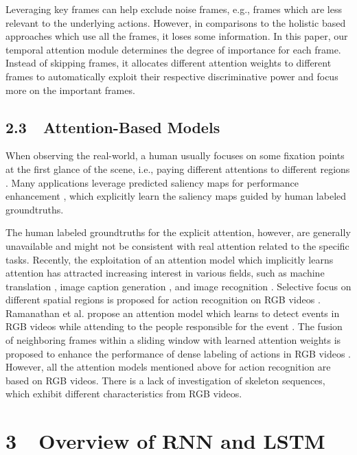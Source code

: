 \documentclass[letterpaper]{article}
\begin{document}
Leveraging key frames can help exclude noise frames, e.g., frames which are less relevant to the underlying actions. However, in comparisons to the holistic based approaches \cite {simonyan2014two,wu2015modeling,zhu2015co} which use all the frames, it loses some information. In this paper, our temporal attention module determines the degree of importance for each frame. Instead of skipping frames, it allocates different attention weights to different frames to automatically exploit their respective discriminative power and focus more on the important frames.


\subsection{2.3~~Attention-Based Models}
When observing the real-world, a human usually focuses on some fixation points at the first glance of the scene, i.e., paying different attentions to different regions \cite{goferman2012context}. Many applications leverage predicted saliency maps for performance enhancement \cite{yu2010object,jiang2014saliency,bazzani2016recurrent}, which explicitly learn the saliency maps guided by human labeled groundtruths.


The human labeled groundtruths for the explicit attention, however, are generally unavailable and might not be consistent with real attention related to the specific tasks.  Recently, the exploitation of an attention model which implicitly learns attention has attracted increasing interest in various fields, such as machine translation \cite{bahdanau2014neural}, image caption generation \cite{xu2015show}, and image recognition \cite{ba2014multiple}. Selective focus on different spatial regions is proposed for action recognition on RGB videos \cite{sharma2015action}. Ramanathan et al. propose an attention model which learns to detect events in RGB videos while attending to the people responsible for the event \cite{Ramanathan2015action}. The fusion of neighboring frames within a sliding window with learned attention weights is proposed to enhance the performance of dense labeling of actions in RGB videos \cite{yeung2015every}. However, all the attention models mentioned above for action recognition are based on RGB videos. There is a lack of investigation of skeleton sequences, which exhibit different characteristics from RGB videos.


\section{3~~Overview of RNN and LSTM}
\end{document}
